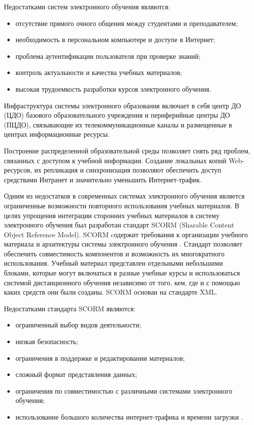 Недостатками систем электронного обучения являются:

\begin{itemize}
\item отсутствие прямого очного общения между студентами и преподавателем;
\item необходимость в персональном компьютере и доступе в Интернет;
\item проблема аутентификации пользователя при проверке знаний;
\item контроль актуальности и качества учебных материалов; 
\item высокая трудоемкость разработки курсов электронного обучения. 
\end{itemize}

Инфраструктура системы электронного образования включает в себя центр ДО (ЦДО) базового образовательного учреждения и периферийные центры ДО (ПЦДО), связывающие их телекоммуникационные каналы и размещенные в центрах информационные ресурсы.

Построение распределенной образовательной среды позволяет снять ряд проблем, связанных с доступом к учебной информации. Создание локальных копий Web-ресурсов, их репликация и синхронизация позволяют обеспечить доступ средствами Интранет и значительно уменьшить Интернет-трафик.

Одним из недостатков в современных системах электронного обучения является ограниченные  возможности повторного использования учебных материалов. В целях упрощения интеграции сторонних учебных материалов в систему электронного обучения был разработан стандарт SCORM (Sharable Content Object Reference Model). SCORM cодержит требования к организации учебного материала и архитектуры системы электронного обучения \cite{parmar2012paper} \cite{qu2002towards}. Стандарт позволяет обеспечить совместимость компонентов и возможность их многократного использования. Учебный материал представлен отдельными небольшими блоками, которые могут включаться в разные учебные курсы и использоваться системой дистанционного обучения независимо от того, кем, где и с помощью каких средств они были созданы. SCORM основан на стандарте XML.

Недостатками стандарта SCORM являются:

\begin{itemize}
\item ограниченный выбор видов деятельности;
\item низкая безопасность;
\item ограничения в поддержке и редактировании материалов;
\item сложный формат представления данных;
\item ограничения по совместимостью с различными системами электронного обучения;
\item использование большого количества интернет-трафика и времени загрузки \cite{bohl2002sharable}.
\end{itemize}

